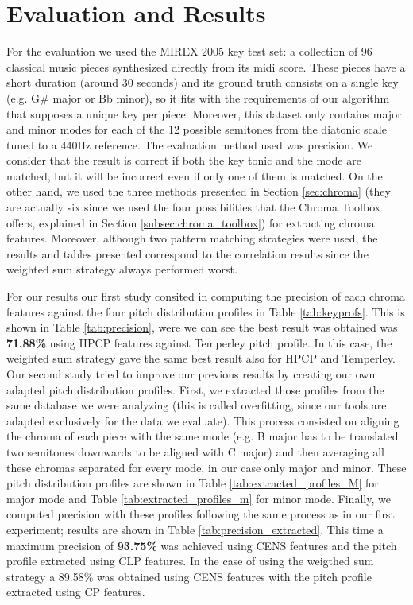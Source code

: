 \documentclass{article}
\begin{document}
\section{Evaluation and Results}\label{sec:eval} %

For the evaluation we used the MIREX 2005 key test set: a collection of 96 classical music pieces synthesized directly from its midi score. These pieces have a short duration (around 30 seconds) and its ground truth consists on a single key (e.g. G\# major or Bb minor), so it fits with the requirements of our algorithm that supposes a unique key per piece. Moreover, this dataset only contains major and minor modes for each of the 12 possible semitones from the diatonic scale tuned to a 440Hz reference.
The evaluation method used was precision. We consider that the result is correct if both the key tonic and the mode are matched, but it will be incorrect even if only one of them is matched.
On the other hand, we used the three methods presented in Section \ref{sec:chroma} (they are actually six since we used the four possibilities that the Chroma Toolbox offers, explained in Section \ref{subsec:chroma_toolbox}) for extracting chroma features.
Moreover, although two pattern matching strategies were used, the results and tables presented correspond to the correlation results since the weighted sum strategy always performed worst.

For our results our first study consited in computing the precision of each chroma features against the four pitch distribution profiles in Table \ref{tab:keyprofs}. This is shown in Table \ref{tab:precision}, were we can see the best result was obtained was \textbf{71.88\%} using HPCP features against Temperley pitch profile. In this case, the weighted sum strategy gave the same best result also for HPCP and Temperley.
Our second study tried to improve our previous results by creating our own adapted pitch distribution profiles. First, we extracted those profiles from the same database we were analyzing (this is called overfitting, since our tools are adapted exclusively for the data we evaluate). This process consisted on aligning the chroma of each piece with the same mode (e.g. B major has to be translated two semitones downwards to be aligned with C major) and then averaging all these chromas separated for every mode, in our case only major and minor. These pitch distribution profiles are shown in Table \ref{tab:extracted_profiles_M} for major mode and Table \ref{tab:extracted_profiles_m} for minor mode. Finally, we computed precision with these profiles following the same process as in our first experiment; results are shown in Table \ref{tab:precision_extracted}. This time a maximum precision of \textbf{93.75\%} was achieved using CENS features and the pitch profile extracted using CLP features. In the case of using the weigthed sum strategy a 89.58\% was obtained using CENS features with the pitch profile extracted using CP features.
\end{document}
